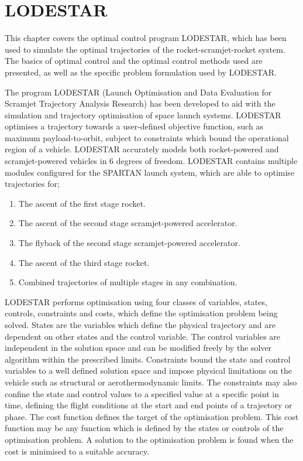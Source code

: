 
\cleardoublepage
\chapter{LODESTAR}\label{chapter:LODESTAR}	
This chapter covers the optimal control program LODESTAR, which has been used to simulate the optimal trajectories of the rocket-scramjet-rocket system. The basics of optimal control and the optimal control methods used are presented, as well as the specific problem formulation used by LODESTAR.

The program LODESTAR (Launch Optimisation and Data Evaluation for Scramjet Trajectory Analysis Research) has been developed to aid with the simulation and trajectory optimisation of space launch systems.  LODESTAR optimises a trajectory towards a user-defined objective function, such as maximum payload-to-orbit, subject to constraints which bound the operational region of a vehicle. LODESTAR accurately models both rocket-powered and scramjet-powered vehicles in 6 degrees of freedom. LODESTAR contains multiple modules configured for the SPARTAN launch system, which are able to optimise trajectories for;

\begin{enumerate}
 \item The ascent of the first stage rocket.
 \item The ascent of the second stage scramjet-powered accelerator.
 \item The flyback of the second stage scramjet-powered accelerator.
 \item The ascent of the third stage rocket.
 \item Combined trajectories of multiple stages in any combination.
\end{enumerate}

LODESTAR performs optimisation using four classes of variables, states, controls, constraints and costs, which define the optimisation problem being solved. States are the variables which define the physical trajectory and are dependent on other states and the control variable. The control variables are independent in the solution space and can be modified freely by the solver algorithm within the prescribed limits.  Constraints bound the state and control variables to a well defined solution space and impose physical limitations on the vehicle such as structural or aerothermodynamic limits.
The constraints may also confine the state and control values to a specified value at a specific point in time, defining the flight conditions at the start and end points of a trajectory or phase. The cost function defines the target of the optimisation problem. This cost function may be any function which is defined by the states or controls of the optimisation problem. A solution to the optimisation problem is found when the cost is minimised to a suitable accuracy. 

